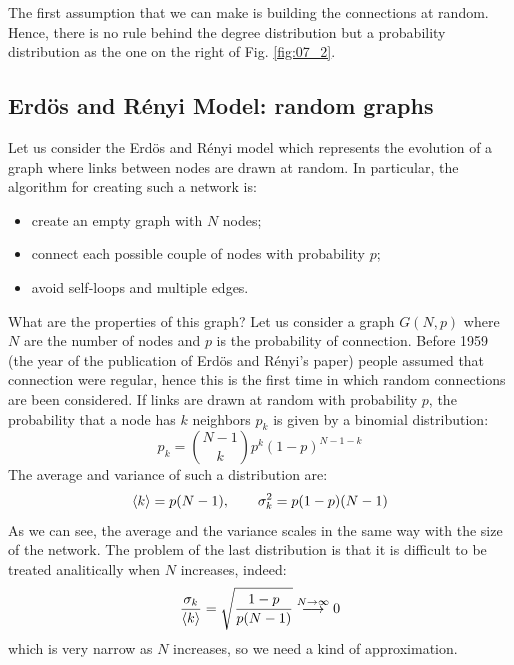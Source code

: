 \documentclass[../main/main.tex]{subfiles}
\begin{document}
The first assumption that we can make is building the connections at random. Hence, there is no rule behind the degree distribution but a probability distribution as the one on the right of Fig. \ref{fig:07_2}.

\subsection{Erdös and Rényi Model: random graphs}
Let us consider the Erdös and Rényi model which represents the evolution of a graph where links between nodes are drawn at random. In particular, the algorithm for creating such a network is:
\begin{itemize}
\item create an empty graph with $N$ nodes;
\item connect each possible couple of nodes with probability $p$;
\item avoid self-loops and multiple edges.
\end{itemize}
What are the properties of this graph?
Let us consider a graph \( G(N,p) \) where \( N \) are the number of nodes and \( p \) is the probability of connection.
Before 1959 (the year of the publication of Erdös and Rényi's paper) people assumed that connection were regular, hence this is the first time in which random connections are been considered.
If links are drawn at random with probability $p$, the probability that a node has $k$ neighbors $p_k$ is given by a binomial distribution:
\begin{equation}
  p_k = \binom{N-1}{k} p^k (1-p)^{N-1-k}
\end{equation}
The average and variance of such a distribution are:
\begin{equation}
  \expval{k} = p(N-1), \qquad \sigma _k^2 = p(1-p)(N-1)
\end{equation}
As we can see, the average and the variance scales in the same way with the size of the network.
The problem of the last distribution is that it is difficult to be treated analitically when \( N \) increases, indeed:
\begin{equation*}
  \frac{\sigma _k}{\expval{k} } = \sqrt{\frac{1-p}{p(N-1)}} \overset{N \rightarrow \infty }{\longrightarrow } 0
\end{equation*}
which is very narrow as \( N \) increases, so we need a kind of approximation.
\end{document}
